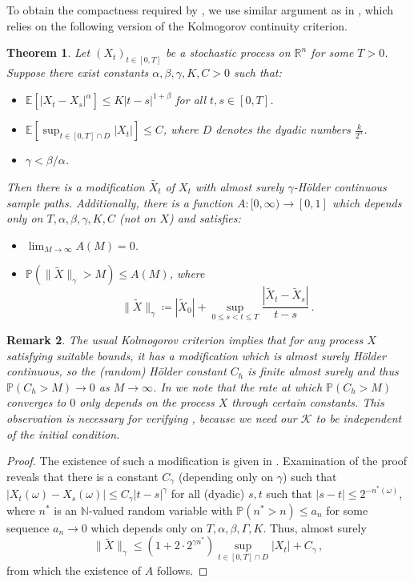 \documentclass[final]{amsart}
\newtheorem{thm}{Theorem}
\newtheorem{rem}[thm]{Remark}
\numberwithin{thm}{section}
\numberwithin{equation}{section}
\newcommand{\E}{\mathbb{E}}
\newcommand{\Prb}{\mathbb{P}}
\newcommand{\N}{\mathbb{N}}
\newcommand{\R}{\mathbb{R}}
\newcommand{\K}{\mathcal{K}}
\begin{document}
To obtain the compactness required by , we use  similar argument as in \cite[Lemma 3.3]{functional}, which relies on the following version of the Kolmogorov continuity criterion.

\begin{thm}\label{Kolmogorov}
    Let $(X_t)_{t\in[0, T]}$ be a stochastic process on $\R^n$ for some $T > 0$. Suppose there exist constants $\alpha, \beta, \gamma, K, C > 0$ such that:
    \begin{itemize}
        \item $\E[|X_t - X_s|^\alpha] \leq K|t-s|^{1 + \beta}$ for all $t,s \in [0,T]$.
        \item $\E[\sup_{t \in [0,T] \cap D} |X_t|] \leq C$, where $D$ denotes the dyadic numbers $\frac{k}{2^n}$.
        \item $\gamma < \beta / \alpha$.
    \end{itemize}

    Then there is a modification $\tilde{X_t}$ of $X_t$ with almost surely $\gamma$-H\"{o}lder continuous sample paths. Additionally, there is a function $A: [0,\infty) \to [0,1]$ which depends only on $T,\alpha,\beta,\gamma,K,C$ (not on $X$) and satisfies: \begin{itemize}
        \item $\lim_{M \to \infty} A(M) = 0$.
        \item $\Prb(\|\tilde{X}\|_\gamma > M) \leq A(M)$, where $$\|\tilde{X}\|_\gamma \coloneqq |\tilde{X}_0| + \sup_{0 \leq s < t \leq T} \frac{|\tilde{X}_t - \tilde{X}_s|}{t-s} \,.$$
    \end{itemize}
\end{thm}

\begin{rem}
    The usual Kolmogorov criterion implies that for any process $X$ satisfying suitable bounds, it has a modification which is almost surely H\"{o}lder continuous, so the (random) H\"{o}lder constant $C_h$ is finite almost surely and thus $\Prb(C_h > M) \to 0$ as $M \to \infty$. In  we note that the rate at which $\Prb(C_h > M)$ converges to $0$ only depends on the process $X$ through certain constants. This observation is necessary for verifying , because we need our $\K$ to be independent of the initial condition.
\end{rem}

\begin{proof}
    The existence of such a modification is given in \cite[Theorem 2.9]{LeGall}. Examination of the proof reveals that there is a constant $C_\gamma$ (depending only on $\gamma$) such that $|X_t(\omega) - X_s(\omega)| \leq C_\gamma |t-s|^\gamma$ for all (dyadic) $s,t$ such that $|s-t| \leq 2^{-n^*(\omega)}$, where $n^*$ is an $\N$-valued random variable with $\Prb(n^* > n) \leq a_n$ for some sequence $a_n \to 0$ which depends only on $T,\alpha,\beta,\Gamma,K$. Thus, almost surely $$\|\tilde{X}\|_\gamma \leq (1 + 2\cdot2^{\gamma n^*})\sup_{t \in [0,T] \cap D}|X_t| + C_\gamma \,,$$ from which the existence of $A$ follows.
\end{proof}
\end{document}
